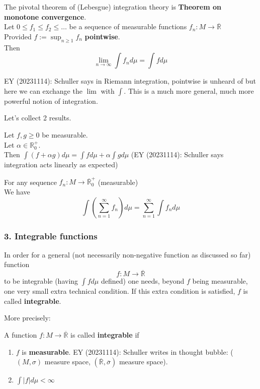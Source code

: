 The pivotal theorem of (Lebesgue) integration theory is \textbf{Theorem on monotone convergence}. \\

Let $0 \leq f_1 \leq f_2 \leq \dots$ be a sequence of measurable functions $f_n: M \to \overline{\mathbb{R}}$ \\

Provided $f := \sup_{n \geq 1} f_n$ \textbf{pointwise}. \\

Then
\[
\lim_{n\to \infty} \int f_n d\mu = \int f d\mu
\]

EY (20231114): Schuller says in Riemann integration, pointwise is unheard of but here we can exchange the $\lim$ with $\int$. This is a much more general, much more powerful notion of integration.

Let's collect 2 results.

\begin{theorem}
	Let $f,g \geq 0$ be measurable. \\
	Let $\alpha \in \mathbb{R}^+_0$. \\
	Then $\int (f + \alpha g) d\mu = \int f d\mu + \alpha \int g d\mu$ (EY (20231114): Schuller says integration acts linearly as expected) 
\end{theorem}

\begin{theorem}
	For any sequence $f_n:M \to \overline{\mathbb{R}}_0^+$ (measurable) \\
	We have
	\[
	\int \left( \sum_{n=1}^{\infty} f_n \right) d\mu = \sum_{n=1}^{\infty} \int f_n d\mu
	\]
\end{theorem}

\subsubsection{3. Integrable functions}

In order for a general (not necessarily non-negative function as discussed so far) function
\[
f: M \to \overline{\mathbb{R}}
\]
to be integrable (having $\int f d\mu$ defined) one needs, beyond $f$ being measurable, one very small extra technical condition. If this extra condition is satisfied, $f$ is called \textbf{integrable}.

More precisely:

\begin{definition}
	A function $f: M \to \overline{\mathbb{R}}$ is called \textbf{integrable} if 
	\begin{enumerate}
		\item[(i)] $f$ is \textbf{measurable}. EY (20231114): Schuller writes in thought bubble: ($(M, \sigma)$ measure space, $(\overline{\mathbb{R}}, \overline{\sigma})$ measure space).
		\item[(ii)] $\int |f| d\mu < \infty$
	\end{enumerate} 
\end{definition}

